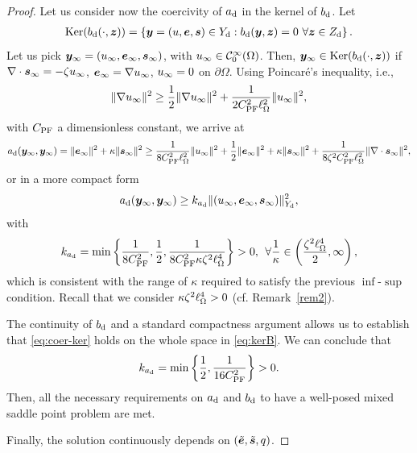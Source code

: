 \begin{proof}
Let us consider now the coercivity of $\ad$ in the kernel of $\bd$. Let 
\begin{align}
\Kernel(\bd(\cdot,\zF)) = \left\lbrace \yF = (\uF,\eF,\sF)\in\YSd : 
\bd(\yF,\zF) = 0 ~ \forall \zF\in \ZSd\right\rbrace.\label{eq:kerB}
\end{align}
Let us pick $\yF_\infty = (\uF_\infty,\eF_\infty,\sF_\infty)$, with $\uF_\infty \in {\cal C}^\infty_0(\Omega)$. Then, $\yF_\infty\in \Kernel(\bd(\cdot,\zF))$ if $\nabla\cdot\sF_\infty = -\zeta\uF_\infty$, $\eF_\infty = \nabla\uF_\infty$, $\uF_\infty = 0$ on $\partial\Omega$. Using Poincaré's inequality, i.e.,
$$ \norm[]{\nabla\uF_\infty}^2 \geq \frac12\norm[]{\nabla\uF_\infty}^2+\frac{1}{2\CPF^2\length^2}\norm[]{\uF_\infty}^2,
$$
with $\CPF$ a dimensionless constant, we arrive at
$$\ad(\yF_\infty,\yF_\infty) = \norm[]{\eF_\infty}^2+\kappa\norm[]{\sF_\infty}^2 \geq \frac{1}{8\CPF^2\length^2}\norm[]{\uF_\infty}^2+\frac12\norm[]{\eF_\infty}^2+\kappa\norm[]{\sF_\infty}^2+\frac{1}{8\zeta^2\CPF^2\length^2}\norm[]{\nabla\cdot\sF_\infty}^2,$$
or in a more compact form
\begin{equation}
\ad(\yF_\infty,\yF_\infty) \geq \kad\norm[\YSd]{(\uF_\infty,\eF_\infty,\sF_\infty)}^2, \label{eq:coer-ker}
\end{equation}
with
$$\kad = \min\left\lbrace\frac{1}{8\CPF^2},\frac12,\frac{1}{8\CPF^2\kappa\zeta^2\length^4}\right\rbrace > 0, \:\:\forall\frac{1}{\kappa}\in\left(\frac{\zeta^2\length^4}{2},\infty\right),$$
which is consistent with the range of $\kappa$ required to satisfy the previous $\inf$-$\sup$ condition. Recall that we consider $\kappa\zeta^2\length^4 > 0$ (cf. Remark~\ref{rem2}).

The continuity of $\bd$ and a standard compactness argument allows us to establish that \eqref{eq:coer-ker} holds on the whole space in \eqref{eq:kerB}. We can conclude that
$$\kad = \min\left\lbrace\frac12,\frac{1}{16\CPF^2}\right\rbrace > 0.$$
Then, all the necessary requirements on $\ad$ and $\bd$ to have a well-posed mixed saddle point problem are met.

Finally, the solution continuously depends on $(\eFt,\sFt,q)$.
\end{proof}